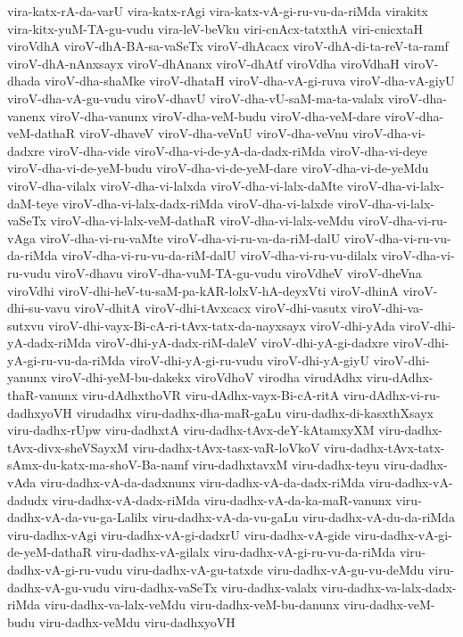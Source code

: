 {vira-katx-rA-da-varU
vira-katx-rAgi
vira-katx-vA-gi-ru-vu-da-riMda
virakitx
vira-kitx-yuM-TA-gu-vudu
vira-leV-beVku
viri-cnAcx-tatxthA
viri-cnicxtaH
viroVdhA
viroV-dhA-BA-sa-vaSeTx
viroV-dhAcacx
viroV-dhA-di-ta-reV-ta-ramf
viroV-dhA-nAnxsayx
viroV-dhAnanx
viroV-dhAtf
viroVdha
viroVdhaH
viroV-dhada
viroV-dha-shaMke
viroV-dhataH
viroV-dha-vA-gi-ruva
viroV-dha-vA-giyU
viroV-dha-vA-gu-vudu
viroV-dhavU
viroV-dha-vU-saM-ma-ta-valalx
viroV-dha-vanenx
viroV-dha-vanunx
viroV-dha-veM-budu
viroV-dha-veM-dare
viroV-dha-veM-dathaR
viroV-dhaveV
viroV-dha-veVnU
viroV-dha-veVnu
viroV-dha-vi-dadxre
viroV-dha-vide
viroV-dha-vi-de-yA-da-dadx-riMda
viroV-dha-vi-deye
viroV-dha-vi-de-yeM-budu
viroV-dha-vi-de-yeM-dare
viroV-dha-vi-de-yeMdu
viroV-dha-vilalx
viroV-dha-vi-lalxda
viroV-dha-vi-lalx-daMte
viroV-dha-vi-lalx-daM-teye
viroV-dha-vi-lalx-dadx-riMda
viroV-dha-vi-lalxde
viroV-dha-vi-lalx-vaSeTx
viroV-dha-vi-lalx-veM-dathaR
viroV-dha-vi-lalx-veMdu
viroV-dha-vi-ru-vAga
viroV-dha-vi-ru-vaMte
viroV-dha-vi-ru-va-da-riM-dalU
viroV-dha-vi-ru-vu-da-riMda
viroV-dha-vi-ru-vu-da-riM-dalU
viroV-dha-vi-ru-vu-dilalx
viroV-dha-vi-ru-vudu
viroV-dhavu
viroV-dha-vuM-TA-gu-vudu
viroVdheV
viroV-dheVna
viroVdhi
viroV-dhi-heV-tu-saM-pa-kAR-lolxV-hA-deyxVti
viroV-dhinA
viroV-dhi-su-vavu
viroV-dhitA
viroV-dhi-tAvxcacx
viroV-dhi-vasutx
viroV-dhi-va-sutxvu
viroV-dhi-vayx-Bi-cA-ri-tAvx-tatx-da-nayxsayx
viroV-dhi-yAda
viroV-dhi-yA-dadx-riMda
viroV-dhi-yA-dadx-riM-daleV
viroV-dhi-yA-gi-dadxre
viroV-dhi-yA-gi-ru-vu-da-riMda
viroV-dhi-yA-gi-ru-vudu
viroV-dhi-yA-giyU
viroV-dhi-yanunx
viroV-dhi-yeM-bu-dakekx
viroVdhoV
virodha
virudAdhx
viru-dAdhx-thaR-vanunx
viru-dAdhxthoVR
viru-dAdhx-vayx-Bi-cA-ritA
viru-dAdhx-vi-ru-dadhxyoVH
virudadhx
viru-dadhx-dha-maR-gaLu
viru-dadhx-di-kasxthXsayx
viru-dadhx-rUpw
viru-dadhxtA
viru-dadhx-tAvx-deY-kAtamxyXM
viru-dadhx-tAvx-divx-sheVSayxM
viru-dadhx-tAvx-tasx-vaR-loVkoV
viru-dadhx-tAvx-tatx-sAmx-du-katx-ma-shoV-Ba-namf
viru-dadhxtavxM
viru-dadhx-teyu
viru-dadhx-vAda
viru-dadhx-vA-da-dadxnunx
viru-dadhx-vA-da-dadx-riMda
viru-dadhx-vA-dadudx
viru-dadhx-vA-dadx-riMda
viru-dadhx-vA-da-ka-maR-vanunx
viru-dadhx-vA-da-vu-ga-Lalilx
viru-dadhx-vA-da-vu-gaLu
viru-dadhx-vA-du-da-riMda
viru-dadhx-vAgi
viru-dadhx-vA-gi-dadxrU
viru-dadhx-vA-gide
viru-dadhx-vA-gi-de-yeM-dathaR
viru-dadhx-vA-gilalx
viru-dadhx-vA-gi-ru-vu-da-riMda
viru-dadhx-vA-gi-ru-vudu
viru-dadhx-vA-gu-tatxde
viru-dadhx-vA-gu-vu-deMdu
viru-dadhx-vA-gu-vudu
viru-dadhx-vaSeTx
viru-dadhx-valalx
viru-dadhx-va-lalx-dadx-riMda
viru-dadhx-va-lalx-veMdu
viru-dadhx-veM-bu-danunx
viru-dadhx-veM-budu
viru-dadhx-veMdu
viru-dadhxyoVH
}

